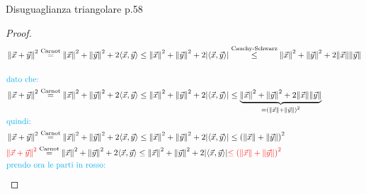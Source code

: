 \documentclass{article}  %
\begin{document}
\begin{theorem}{Disuguaglianza triangolare p.58}
\begin{proof}
\begin{align*}
			 & \left\|\vec{x}+\vec{y}\right\|^2 \overset{\text{Carnot}}{=} \left\|\vec{x}\right\|^2+\left\|\vec{y}\right\|^2+2\langle \vec{x}, \vec{y} \rangle \leq \left\|\vec{x}\right\|^2+\left\|\vec{y}\right\|^2+2 |\langle \vec{x}, \vec{y} \rangle| \overset{\text{Cauchy-Schwarz}}{\leq} \left\|\vec{x}\right\|^2+\left\|\vec{y}\right\|^2+2 \|\vec{x}\|\|\vec{y}\|                       \\
			\\&\textcolor{cyan}{\text{dato che:}} \\
			 & \left\|\vec{x}+\vec{y}\right\|^2 \overset{\text{Carnot}}{=} \left\|\vec{x}\right\|^2+\left\|\vec{y}\right\|^2+2\langle \vec{x}, \vec{y} \rangle \leq \left\|\vec{x}\right\|^2+\left\|\vec{y}\right\|^2+2 |\langle \vec{x}, \vec{y} \rangle| \leq \underbrace{\left\|\vec{x}\right\|^2+\left\|\vec{y}\right\|^2+2 \|\vec{x}\|\|\vec{y}\|}_{=\left(\|\vec{x}\|+\|\vec{y}\|\right)^2} \\
			 & \textcolor{cyan}{\text{quindi:}}                                                                                                                                                                                                                                                                                                                                                   \\
			 & \left\|\vec{x}+\vec{y}\right\|^2 \overset{\text{Carnot}}{=} \left\|\vec{x}\right\|^2+\left\|\vec{y}\right\|^2+2\langle \vec{x}, \vec{y} \rangle \leq \left\|\vec{x}\right\|^2+\left\|\vec{y}\right\|^2+2 |\langle \vec{x}, \vec{y} \rangle| \leq {\left(\|\vec{x}\|+\|\vec{y}\|\right)^2}                                                                                          \\
			 & \textcolor{red}{\left\|\vec{x}+\vec{y}\right\|^2} \overset{\text{Carnot}}{=} \left\|\vec{x}\right\|^2+\left\|\vec{y}\right\|^2+2\langle \vec{x}, \vec{y} \rangle \leq \left\|\vec{x}\right\|^2+\left\|\vec{y}\right\|^2+2 |\langle \vec{x}, \vec{y} \rangle| \textcolor{red}{\leq {\left(\|\vec{x}\|+\|\vec{y}\|\right)^2}}                                                        \\
			 & \textcolor{cyan}{\text{prendo ora le parti in rosso: }}                                                                                                                                                                                                                                                                                                                            \\

\end{align*}
\end{proof}
\end{theorem}
\end{document}
